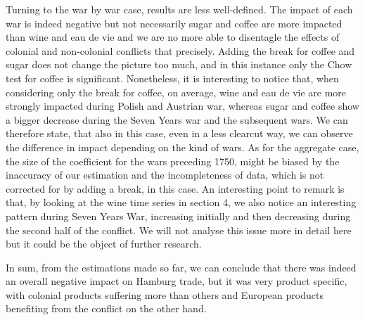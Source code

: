 \documentclass[12pt,a4paper,titlepage,english]{article}
\begin{document}
Turning to the war by war case, results are less well-defined. The impact of each war is indeed negative but not necessarily sugar and coffee are more impacted than wine and eau de vie and we are no more able to disentagle the effects of colonial and non-colonial conflicts that precisely. Adding the break for coffee and sugar does not change the picture too much, and in this instance only the Chow test for coffee is significant. Nonetheless, it is interesting to notice that, when considering only the break for coffee, on average, wine and eau de vie are more strongly impacted during Polish and Austrian war, whereas sugar and coffee show a bigger decrease during the Seven Years war and the subsequent wars. We can therefore state, that also in this case, even in a less clearcut way, we can observe the difference in impact depending on the kind of wars. As for the aggregate case, the size of the coefficient for the wars preceding 1750, might be biased by the inaccuracy of our estimation and the incompleteness of data, which is not corrected for by adding a break, in this case. 
An interesting point to remark is that, by looking at the wine time series in section 4, we also notice an interesting pattern during Seven Years War, increasing initially and then decreasing during the second half of the conflict.  We will not analyse this issue more in detail here but it could be the object of further research. 


In sum, from the estimations made so far, we can conclude that there was indeed an overall negative impact on Hamburg trade, but it was very product specific, with colonial products suffering more than others and European products benefiting from the conflict on the other hand.
\end{document}
